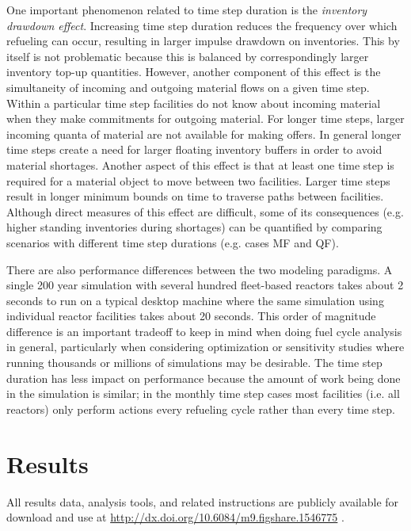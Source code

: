 \documentclass{style}
\begin{document}
One important phenomenon related to time step duration is the \emph{inventory
drawdown effect}.  Increasing time step duration reduces the frequency over
which refueling can occur, resulting in larger impulse drawdown on
inventories. This by itself is not problematic because this is balanced by
correspondingly larger inventory top-up quantities.  However, another
component of this effect is the simultaneity of incoming and outgoing material
flows on a given time step.  Within a particular time step facilities do not
know about incoming material when they make commitments for outgoing material.
For longer time steps, larger incoming quanta of material are not available
for making offers. In general longer time steps create a need for larger
floating inventory buffers in order to avoid material shortages.  Another
aspect of this effect is that at least one time step is required for a
material object to move between two facilities. Larger time steps result in
longer minimum bounds on time to traverse paths between facilities. Although
direct measures of this effect are difficult, some of its consequences (e.g.
higher standing inventories during shortages) can be quantified by comparing
scenarios with different time step durations (e.g.  cases MF and QF).

There are also performance differences between the two modeling paradigms.  A
single 200 year simulation with several hundred fleet-based reactors takes
about 2 seconds to run on a typical desktop machine where the same simulation
using individual reactor facilities takes about 20 seconds.  This order of
magnitude difference is an important tradeoff to keep in mind when doing fuel
cycle analysis in general, particularly when considering optimization or
sensitivity studies where running thousands or millions of simulations may be
desirable.  The time step duration has less impact on performance because the
amount of work being done in the simulation is similar; in the monthly time
step cases most facilities (i.e. all reactors) only perform actions every
refueling cycle rather than every time step.

\section{Results}

All results data, analysis tools, and related instructions are publicly
available for download and use at
\url{http://dx.doi.org/10.6084/m9.figshare.1546775} \cite{Carlsen2015}.
\end{document}
